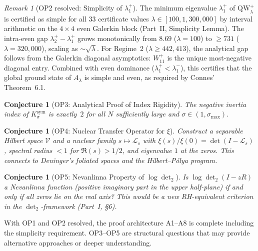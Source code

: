 \documentclass[12pt,a4paper]{article}
\newtheorem{conjecture}[theorem]{Conjecture}
\theoremstyle{definition}
\theoremstyle{remark}
\newtheorem{remark}[theorem]{Remark}
\newcommand{\Ksym}{K_\sigma^{\mathrm{sym}}}
\begin{document}
\begin{remark}[OP2 resolved: Simplicity of $\lambda_1^+$]
\label{rem:OP2-resolved}
The minimum eigenvalue $\lambda_1^+$ of $\mathrm{QW}_\lambda^+$ is certified as simple for all $33$ certificate values $\lambda \in [100, 1{,}300{,}000]$ by interval arithmetic on the $4 \times 4$ even Galerkin block (Part~II, Simplicity Lemma). The intra-even gap $\lambda_2^+ - \lambda_1^+$ grows monotonically from $8.69$ ($\lambda = 100$) to $\geq 731$ ($\lambda = 320{,}000$), scaling as $\sim\!\sqrt{\lambda}$. For Regime~2 ($\lambda \geq 442{,}413$), the analytical gap follows from the Galerkin diagonal asymptotics: $W_{11}^+$ is the unique most-negative diagonal entry. Combined with even dominance ($\lambda_1^+ < \lambda_1^-$), this certifies that the global ground state of $A_\lambda$ is simple and even, as required by Connes' Theorem~6.1.
\end{remark}

\begin{conjecture}[OP3: Analytical Proof of Index Rigidity]
\label{conj:OP3}
The negative inertia index of $\Ksym$ is exactly~$2$ for all $N$ sufficiently large and $\sigma \in (1, \sigma_{\max})$.
\end{conjecture}

\begin{conjecture}[OP4: Nuclear Transfer Operator for $\xi$]
\label{conj:OP4}
Construct a separable Hilbert space $\mathcal{V}$ and a nuclear family $s \mapsto \mathcal{L}_s$ with $\xi(s)/\xi(0) = \det(I - \mathcal{L}_s)$, spectral radius $< 1$ for $\Re(s) > 1/2$, and eigenvalue $1$ at the zeros. This connects to Deninger's foliated spaces and the Hilbert--P\'olya program.
\end{conjecture}

\begin{conjecture}[OP5: Nevanlinna Property of $\log\det_2$]
\label{conj:OP5}
Is $\log\det_2(I - zR)$ a Nevanlinna function (positive imaginary part in the upper half-plane) if and only if all zeros lie on the real axis? This would be a new RH-equivalent criterion in the $\det_2$-framework (Part~I, \S6).
\end{conjecture}

\noindent With OP1 and OP2 resolved, the proof architecture A1--A8 is complete including the simplicity requirement. OP3--OP5 are structural questions that may provide alternative approaches or deeper understanding.


\end{document}
